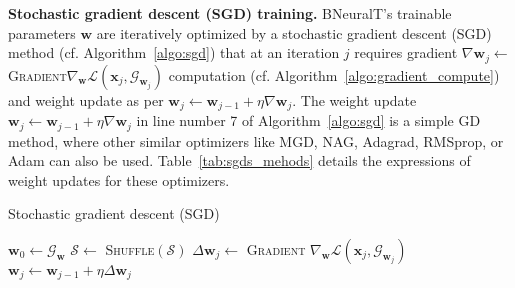 \documentclass[11pt,a4paper]{article}
\begin{document}
    \textbf{Stochastic gradient descent (SGD) training.}
    BNeuralT's trainable parameters $ \textbf{w} $ are iteratively optimized by a stochastic gradient descent (SGD) method (cf. Algorithm~\ref{algo:sgd}) that at an iteration $ j $ requires gradient $\nabla \mathbf{w}_j \leftarrow $ \textsc{Gradient}$ \nabla_\mathbf{w} \mathcal{L}(\mathbf{x}_j, \mathcal{G}_{\mathbf{w}_j})$ computation (cf. Algorithm~\ref{algo:gradient_compute}) and weight update as per $ \mathbf{w}_j \leftarrow \mathbf{w}_{j-1} + \eta \nabla \mathbf{w}_j$. The weight update $ \mathbf{w}_j \leftarrow \mathbf{w}_{j-1} + \eta \nabla \mathbf{w}_j$ in line number 7 of Algorithm~\ref{algo:sgd} is a simple GD method, where other similar optimizers like MGD, NAG, Adagrad, RMSprop, or Adam can also be used. Table~\ref{tab:sgds_mehods}  details the expressions of weight updates for these optimizers.  
\begin{algorithm}[h!]
        \caption{Stochastic gradient descent (SGD)}
        \label{algo:sgd}
        \begin{algorithmic}[1] 
             
            \State $ \mathbf{w}_0 \leftarrow \mathcal{G}_\mathbf{w}$ 
            \State $\mathcal{S} \leftarrow$ \textsc{Shuffle}$(\mathcal{S})$ 
            \State $ \Delta \mathbf{w}_j \leftarrow $ \textsc{Gradient} $ \nabla_\mathbf{w} \mathcal{L}(\mathbf{x}_j, \mathcal{G}_{\mathbf{w}_j})$  
            \State $ \mathbf{w}_j \leftarrow \mathbf{w}_{j-1} + \eta\Delta \mathbf{w}_j$ 
            \EndFor
            \EndFor    
            \EndProcedure  
        \end{algorithmic}
    \end{algorithm}
    
\end{document}
